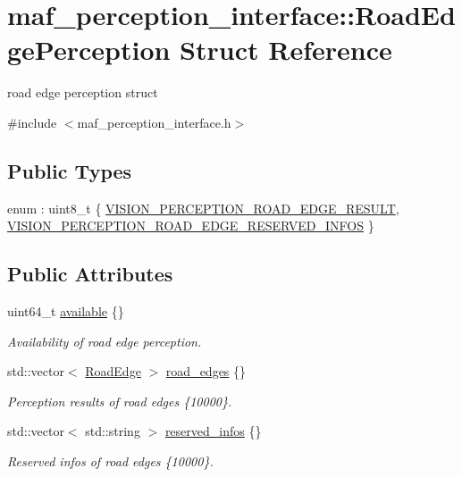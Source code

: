 \hypertarget{structmaf__perception__interface_1_1RoadEdgePerception}{}\section{maf\+\_\+perception\+\_\+interface\+:\+:Road\+Edge\+Perception Struct Reference}
\label{structmaf__perception__interface_1_1RoadEdgePerception}


road edge perception struct  




{\ttfamily \#include $<$maf\+\_\+perception\+\_\+interface.\+h$>$}

\subsection*{Public Types}
\begin{DoxyCompactItemize}
\item 
enum \+: uint8\+\_\+t \{ \hyperlink{structmaf__perception__interface_1_1RoadEdgePerception_aa1ba5457da40c90d05be4d21f3641b4ba7f9de38ac387e54a63f14644eacdd3c1}{V\+I\+S\+I\+O\+N\+\_\+\+P\+E\+R\+C\+E\+P\+T\+I\+O\+N\+\_\+\+R\+O\+A\+D\+\_\+\+E\+D\+G\+E\+\_\+\+R\+E\+S\+U\+LT}, 
\hyperlink{structmaf__perception__interface_1_1RoadEdgePerception_aa1ba5457da40c90d05be4d21f3641b4bafbe0e5c5755dc292a0d3d0ec65236748}{V\+I\+S\+I\+O\+N\+\_\+\+P\+E\+R\+C\+E\+P\+T\+I\+O\+N\+\_\+\+R\+O\+A\+D\+\_\+\+E\+D\+G\+E\+\_\+\+R\+E\+S\+E\+R\+V\+E\+D\+\_\+\+I\+N\+F\+OS}
 \}
\end{DoxyCompactItemize}
\subsection*{Public Attributes}
\begin{DoxyCompactItemize}
\item 
uint64\+\_\+t \hyperlink{structmaf__perception__interface_1_1RoadEdgePerception_a54277582fa15dab4581bdb17d7d2217d}{available} \{\}
\begin{DoxyCompactList}\small\item\em Availability of road edge perception. \end{DoxyCompactList}\item 
std\+::vector$<$ \hyperlink{structmaf__perception__interface_1_1RoadEdge}{Road\+Edge} $>$ \hyperlink{structmaf__perception__interface_1_1RoadEdgePerception_a568bc1a37aeca593df9ee7ddf4855424}{road\+\_\+edges} \{\}
\begin{DoxyCompactList}\small\item\em Perception results of road edges \{10000\}. \end{DoxyCompactList}\item 
std\+::vector$<$ std\+::string $>$ \hyperlink{structmaf__perception__interface_1_1RoadEdgePerception_a1ce1d64252861c03d3625707900eda3e}{reserved\+\_\+infos} \{\}
\begin{DoxyCompactList}\small\item\em Reserved infos of road edges \{10000\}. \end{DoxyCompactList}\end{DoxyCompactItemize}



